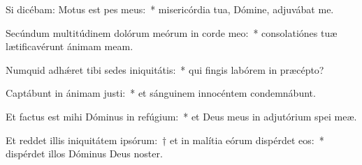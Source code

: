 \item Si dicébam: Motus est pes meus:~* misericórdia tua, Dómine, adjuvábat me.

\item Secúndum multitúdinem dolórum meórum in corde meo:~* consolatiónes tuæ lætificavérunt ánimam meam.

\item Numquid adhǽret tibi sedes iniquitátis:~* qui fingis labórem in præcépto?

\item Captábunt in ánimam justi:~* et sánguinem innocéntem condemnábunt.

\item Et factus est mihi Dóminus in refúgium:~* et Deus meus in adjutórium spei meæ.

\item Et reddet illis iniquitátem ipsórum:~† et in malítia eórum dispérdet eos:~* dispérdet illos Dóminus Deus noster.

